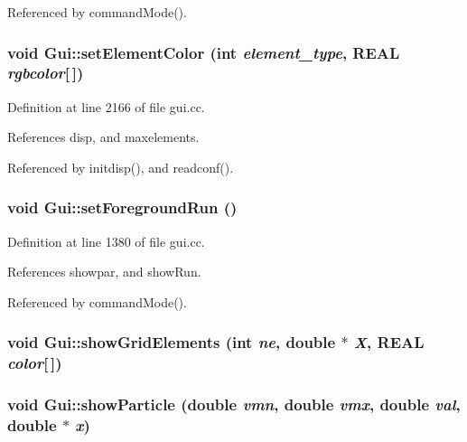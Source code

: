 Referenced by commandMode().\hypertarget{namespaceGui_7ff1dbc60509be2005c1732738066a69}{
\subsubsection[{setElementColor}]{\setlength{\rightskip}{0pt plus 5cm}void Gui::setElementColor (int {\em element\_\-type}, \/  REAL {\em rgbcolor}\mbox{[}$\,$\mbox{]})}}
\label{namespaceGui_7ff1dbc60509be2005c1732738066a69}




Definition at line 2166 of file gui.cc.

References disp, and maxelements.

Referenced by initdisp(), and readconf().\hypertarget{namespaceGui_273a116825827361f5a21f8226589d35}{
\subsubsection[{setForegroundRun}]{\setlength{\rightskip}{0pt plus 5cm}void Gui::setForegroundRun ()}}
\label{namespaceGui_273a116825827361f5a21f8226589d35}




Definition at line 1380 of file gui.cc.

References showpar, and showRun.

Referenced by commandMode().\hypertarget{namespaceGui_8e3c2fd257a10f8ebcb0bb5ca80960cf}{
\subsubsection[{showGridElements}]{\setlength{\rightskip}{0pt plus 5cm}void Gui::showGridElements (int {\em ne}, \/  double $\ast$ {\em X}, \/  REAL {\em color}\mbox{[}$\,$\mbox{]})}}
\label{namespaceGui_8e3c2fd257a10f8ebcb0bb5ca80960cf}


\hypertarget{namespaceGui_ffad4636da327fdb77959a672413695a}{
\subsubsection[{showParticle}]{\setlength{\rightskip}{0pt plus 5cm}void Gui::showParticle (double {\em vmn}, \/  double {\em vmx}, \/  double {\em val}, \/  double $\ast$ {\em x})}}
\label{namespaceGui_ffad4636da327fdb77959a672413695a}




